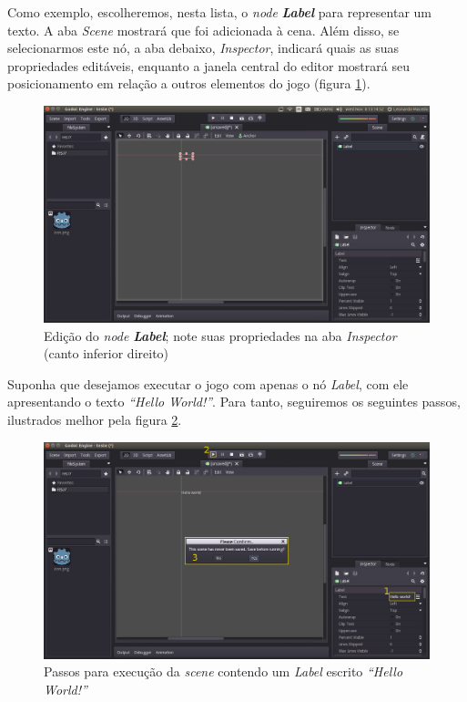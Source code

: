 Como exemplo, escolheremos, nesta lista, o \textit{node} \textbf{\textit{Label}} para representar um texto. A aba \textit{Scene} mostrará que foi adicionada à cena. Além disso, se selecionarmos este nó, a aba debaixo, \textit{Inspector}, indicará quais as suas propriedades editáveis, enquanto a janela central do editor mostrará seu posicionamento em relação a outros elementos do jogo (figura \ref{editor-label}).

\begin{figure}[H]
  \centering
  \includegraphics[width=.9\textwidth]{image/editor-label}
  \caption{Edição do \textit{node} \textbf{\textit{Label}}; note suas propriedades na aba \textit{Inspector} (canto inferior direito)}
  \label{editor-label}
\end{figure}

Suponha que desejamos executar o jogo com apenas o nó \textit{Label}, com ele apresentando o texto \textit{``Hello World!''}. Para tanto, seguiremos os seguintes passos, ilustrados melhor pela figura \ref{editor-run-scene-edit}.

\begin{figure}[H]
  \centering
  \includegraphics[width=.9\textwidth]{image/editor-run-scene-edit}
  \caption{Passos para execução da \textit{scene} contendo um \textit{Label} escrito \textit{``Hello World!''}}
  \label{editor-run-scene-edit}
\end{figure}

